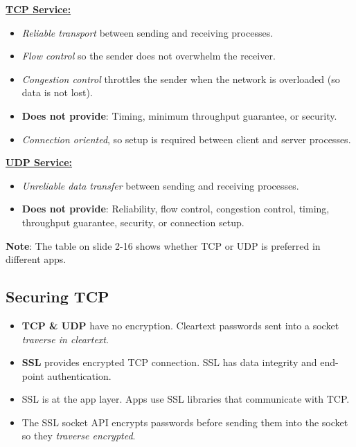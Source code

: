 \documentclass{article}
\begin{document}
\begin{multicols}{2}
\underline{\bf TCP Service:}
\begin{itemize}
\item {\it Reliable transport} between sending and receiving processes.
\item {\it Flow control} so the sender does not overwhelm the receiver.
\item {\it Congestion control} throttles the sender when the network is overloaded (so data is not lost).
\item {\bf Does not provide}: Timing, minimum throughput guarantee, or security.
\item {\it Connection oriented}, so setup is required between client and server processes.
\end{itemize}

\columnbreak

\underline{\bf UDP Service:}
\begin{itemize}
\item {\it Unreliable data transfer} between sending and receiving processes.
\item {\bf Does not provide}: Reliability, flow control, congestion control, timing, throughput guarantee, security, or connection setup.
\end{itemize}
\end{multicols}
{\bf Note}: The table on slide 2-16 shows whether TCP or UDP is preferred in different apps.

\clearpage

\subsection{Securing TCP}

\begin{itemize}
\item {\bf TCP \& UDP} have no encryption. Cleartext passwords sent into a socket {\it traverse in cleartext}.
\item {\bf SSL} provides encrypted TCP connection. SSL has data integrity and end-point authentication.
\item SSL is at the app layer. Apps use SSL libraries that communicate with TCP.
\item The SSL socket API encrypts passwords before sending them into the socket so they {\it traverse encrypted}.
\end{itemize}
\end{document}
